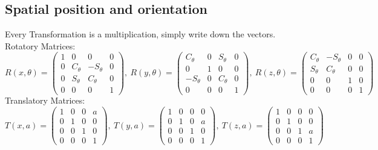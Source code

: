 \documentclass{exerciseBlue}
\begin{document}
\subsection{Spatial position and orientation}
Every Transformation is a multiplication, simply write down the vectors.\\
Rotatory Matrices:\\
$R(x,\theta) = \begin{pmatrix}
1&0&0&0\\
0&C_{\theta}&-S_{\theta}&0\\
0&S_{\theta}&C_{\theta}&0\\
0&0&0&1
\end{pmatrix}, \ 
R(y,\theta) = \begin{pmatrix}
C_{\theta}&0&S_{\theta}&0\\
0&1&0&0\\
-S_{\theta}&0&C_{\theta}&0\\
0&0&0&1
\end{pmatrix}, \ 
R(z,\theta) = \begin{pmatrix}
C_{\theta}&-S_{\theta}&0&0\\
S_{\theta}&C_{\theta}&0&0\\
0&0&1&0\\
0&0&0&1
\end{pmatrix}$\\
Translatory Matrices:\\
$T(x,a) = \begin{pmatrix}
1&0&0&a\\
0&1&0&0\\
0&0&1&0\\
0&0&0&1
\end{pmatrix}, \ 
T(y,a) = \begin{pmatrix}
1&0&0&0\\
0&1&0&a\\
0&0&1&0\\
0&0&0&1
\end{pmatrix}, \ 
T(z,a) = \begin{pmatrix}
1&0&0&0\\
0&1&0&0\\
0&0&1&a\\
0&0&0&1
\end{pmatrix}$
\end{document}
